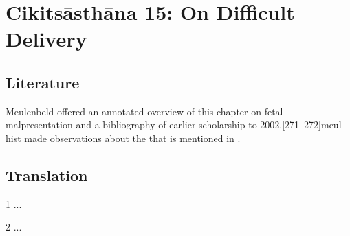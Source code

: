 
\chapter{Cikitsāsthāna 15:  On Difficult Delivery}


\section{Literature} 

Meulenbeld offered an annotated overview of this chapter on fetal
malpresentation and a bibliography of earlier scholarship to
2002.[271--272]{meul-hist}  \citet[517]{das-2003} made 
observations about the  that is mentioned in  
. 

\section{Translation}

\begin{translation}
    
    \item [1] ...
    
    \item [2] ...
    
\end{translation}

